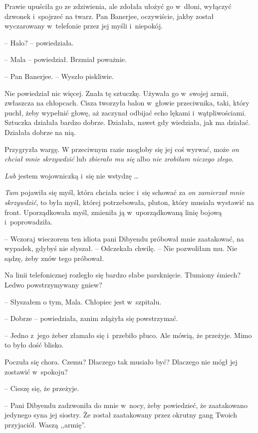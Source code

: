 \documentclass[oneside,polish,11pt,rmheadings]{mwbk}
\begin{document}
Prawie upuściła go ze zdziwienia, ale zdołała ułożyć go w~dłoni, wyłączyć dzwonek i~spojrzeć na twarz. Pan Banerjee, oczywiście, jakby został wyczarowany w~telefonie przez jej myśli i~niepokój. 


-- Halo? -- powiedziała. 


-- Mala -- powiedział. Brzmiał poważnie. 


-- Pan Banerjee. -- Wyszło piskliwie. 


Nie powiedział nic więcej. Znała tę sztuczkę. Używała go w~swojej armii, zwłaszcza na chłopcach. Cisza tworzyła balon w~głowie przeciwnika, taki, który puchł, żeby wypełnić głowę, aż zaczynał odbijać echo lękami i~wątpliwościami. Sztuczka działała bardzo dobrze. Działała, nawet gdy wiedziała, jak ma działać. Działała dobrze na nią. 


Przygryzła wargę. W przeciwnym razie mogłoby się jej coś wyrwać, może \textit{on chciał mnie skrzywdzić} lub \textit{zbierało mu się} albo \textit{nie zrobiłam niczego złego}. 


\textit{Lub} jestem wojowniczką i~się nie wstydzę \ldots


\textit{Tam}  pojawiła się myśl, która chciała uciec i~się schować za \textit{on zamierzał mnie skrzywdzić}, to była myśl, której potrzebowała, pluton, który musiała wystawić na front. Uporządkowała myśl, zmieniła ją w~uporządkowaną linię bojową i~poprowadziła. 


-- Wczoraj wieczorem ten idiota pani Dibyendu próbował mnie zaatakować, na wypadek, gdybyś nie słyszał. -- Odczekała chwilę. -- Nie pozwoliłam mu. Nie sądzę, żeby znów tego próbował. 


Na linii telefonicznej rozległo się bardzo słabe parsknięcie. Tłumiony śmiech? Ledwo powstrzymywany gniew? 

-- Słyszałem o tym, Mala. Chłopiec jest w~szpitalu. 


-- Dobrze -- powiedziała, zanim zdążyła się powstrzymać. 


-- Jedno z~jego żeber złamało się i~przebiło płuco. Ale mówią, że przeżyje. Mimo to było dość blisko. 


Poczuła się chora. Czemu? Dlaczego tak musiało być? Dlaczego nie mógł jej zostawić w~spokoju? 

-- Cieszę się, że przeżyje. 

-- Pani Dibyendu zadzwoniła do mnie w~nocy, żeby powiedzieć, że zaatakowano jedynego syna jej siostry. Że został zaatakowany przez okrutny gang Twoich przyjaciół. Waszą ,,armię''. 
\end{document}
